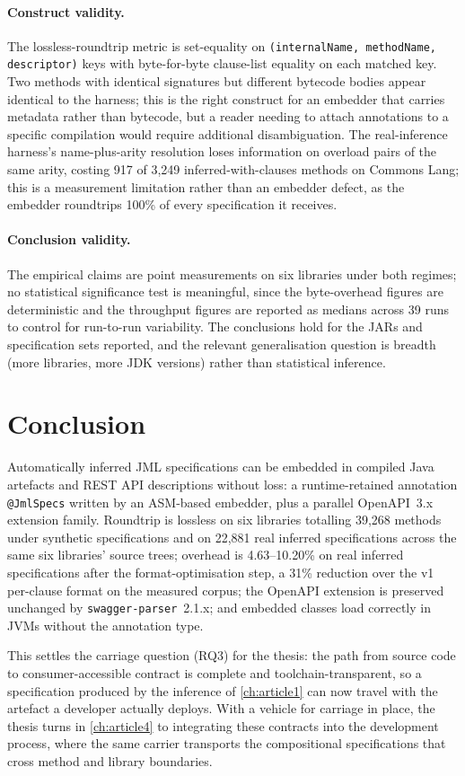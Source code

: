 \paragraph{Construct validity.}
The lossless-roundtrip metric is set-equality on \texttt{(internalName,
methodName, descriptor)} keys with byte-for-byte clause-list equality on each
matched key. Two methods with identical signatures but different bytecode bodies
appear identical to the harness; this is the right construct for an embedder that
carries metadata rather than bytecode, but a reader needing to attach annotations
to a specific compilation would require additional disambiguation. The
real-inference harness's name-plus-arity resolution loses information on overload
pairs of the same arity, costing 917 of 3{,}249 inferred-with-clauses methods on
Commons Lang; this is a measurement limitation rather than an embedder defect, as
the embedder roundtrips 100\% of every specification it receives.

\paragraph{Conclusion validity.}
The empirical claims are point measurements on six libraries under both regimes;
no statistical significance test is meaningful, since the byte-overhead figures
are deterministic and the throughput figures are reported as medians across 39
runs to control for run-to-run variability. The conclusions hold for the JARs and
specification sets reported, and the relevant generalisation question is breadth
(more libraries, more JDK versions) rather than statistical inference.

\section{Conclusion}
\label{sec:a2-conclusion}

Automatically inferred JML specifications can be embedded in compiled Java
artefacts and REST API descriptions without loss: a runtime-retained annotation
\texttt{@JmlSpecs} written by an ASM-based embedder, plus a parallel OpenAPI~3.x
extension family. Roundtrip is lossless on six libraries totalling 39{,}268
methods under synthetic specifications and on 22{,}881 real inferred
specifications across the same six libraries' source trees; overhead is
4.63--10.20\% on real inferred specifications after the format-optimisation step,
a 31\% reduction over the v1 per-clause format on the measured corpus; the
OpenAPI extension is preserved unchanged by \texttt{swagger-parser}~2.1.x; and
embedded classes load correctly in JVMs without the annotation type.

This settles the carriage question (RQ3) for the thesis: the path from source
code to consumer-accessible contract is complete and toolchain-transparent, so a
specification produced by the inference of \cref{ch:article1} can now travel with
the artefact a developer actually deploys. With a vehicle for carriage in place,
the thesis turns in \cref{ch:article4} to integrating these contracts into the
development process, where the same carrier transports the compositional
specifications that cross method and library boundaries.
